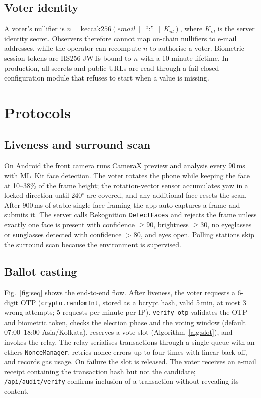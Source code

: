 \documentclass[conference]{IEEEtran}
\newcommand{\code}[1]{\texttt{\small #1}}
\begin{document}
\subsection{Voter identity}
A voter's nullifier is $n = \mathrm{keccak256}(\mathit{email}\,\|\,\text{``:''}\,\|\,K_{id})$, where $K_{id}$ is the server identity secret. Observers therefore cannot map on-chain nullifiers to e-mail addresses, while the operator can recompute $n$ to authorise a voter. Biometric session tokens are HS256 JWTs bound to $n$ with a 10-minute lifetime. In production, all secrets and public URLs are read through a fail-closed configuration module that refuses to start when a value is missing.

\section{Protocols}
\label{sec:protocols}

\subsection{Liveness and surround scan}
\label{sec:liveness}
On Android the front camera runs CameraX preview and analysis every 90\,ms with ML~Kit face detection. The voter rotates the phone while keeping the face at 10--38\% of the frame height; the rotation-vector sensor accumulates yaw in a locked direction until 240$^\circ$ are covered, and any additional face resets the scan. After 900\,ms of stable single-face framing the app auto-captures a frame and submits it. The server calls Rekognition \code{DetectFaces} and rejects the frame unless exactly one face is present with confidence $\geq 90$, brightness $\geq 30$, no eyeglasses or sunglasses detected with confidence $>80$, and eyes open. Polling stations skip the surround scan because the environment is supervised.

\subsection{Ballot casting}
Fig.~\ref{fig:seq} shows the end-to-end flow. After liveness, the voter requests a 6-digit OTP (\code{crypto.randomInt}, stored as a bcrypt hash, valid 5\,min, at most 3 wrong attempts; 5 requests per minute per IP). \code{verify-otp} validates the OTP and biometric token, checks the election phase and the voting window (default 07:00--18:00 Asia/Kolkata), reserves a vote slot (Algorithm~\ref{alg:slot}), and invokes the relay. The relay serialises transactions through a single queue with an ethers \code{NonceManager}, retries nonce errors up to four times with linear back-off, and records gas usage. On failure the slot is released. The voter receives an e-mail receipt containing the transaction hash but not the candidate; \code{/api/audit/verify} confirms inclusion of a transaction without revealing its content.
\end{document}
